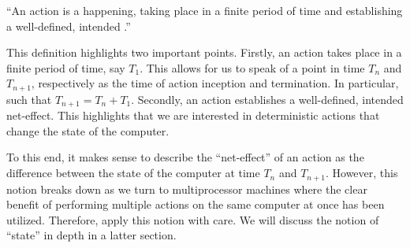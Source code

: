 \begin{definition}

``An action is a happening, taking place in a finite period of time and
establishing a well-defined, intended .''
\cite{dijkstra-introduction}

\end{definition}

This definition highlights two important points. Firstly, an action takes place
in a finite period of time, say $T_1$. This allows for us to speak of a point
in time $T_n$ and $T_{n+1}$, respectively as the time of action inception and
termination. In particular, such that $T_{n+1}=T_n+T_1$. Secondly, an action
establishes a well-defined, intended net-effect. This highlights that we are
interested in deterministic actions that change the state of the computer.

To this end, it makes sense to describe the ``net-effect'' of an action as the
difference between the state of the computer at time $T_n$ and $T_{n+1}$.
However, this notion breaks down as we turn to multiprocessor machines where
the clear benefit of performing multiple actions on the same computer at once
has been utilized.  Therefore, apply this notion with care. We will discuss the
notion of ``state'' in depth in a latter section.
